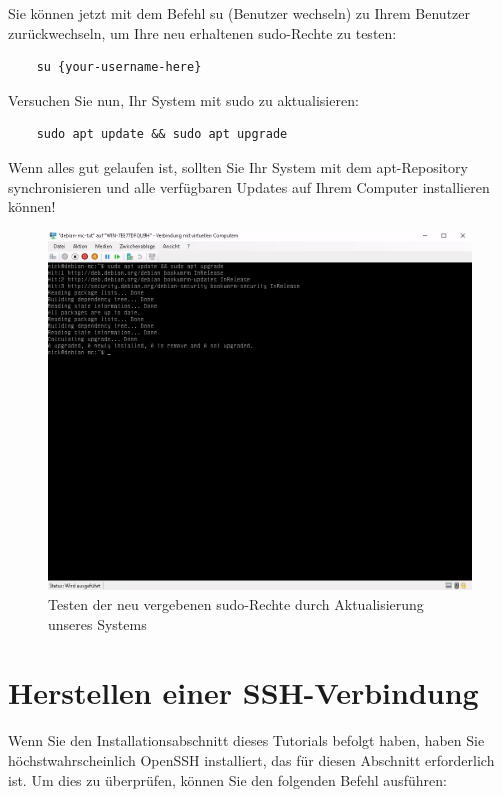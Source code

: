\documentclass[]{article}
\begin{document}
Sie können jetzt mit dem Befehl su (Benutzer wechseln) zu Ihrem Benutzer zurückwechseln, um Ihre neu erhaltenen sudo-Rechte zu testen:

\begin{verbatim}
    su {your-username-here}
\end{verbatim}

Versuchen Sie nun, Ihr System mit sudo zu aktualisieren:

\begin{verbatim}
    sudo apt update && sudo apt upgrade
\end{verbatim}

Wenn alles gut gelaufen ist, sollten Sie Ihr System mit dem apt-Repository synchronisieren und alle verfügbaren Updates auf Ihrem Computer installieren können!

\begin{figure}[h!]
    \caption{Testen der neu vergebenen sudo-Rechte durch Aktualisierung unseres Systems}
    \centering
    \includegraphics[width=1\textwidth]{update}
\end{figure}
\FloatBarrier

\section{Herstellen einer SSH-Verbindung}

Wenn Sie den Installationsabschnitt dieses Tutorials befolgt haben, haben Sie höchstwahrscheinlich OpenSSH installiert, das für diesen Abschnitt erforderlich ist. Um dies zu überprüfen, können Sie den folgenden Befehl ausführen:
\end{document}

